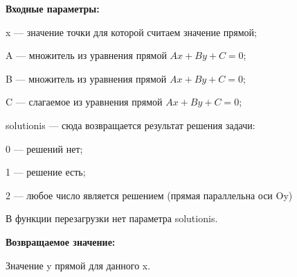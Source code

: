 \textbf{Входные параметры:}  
 
x --- значение точки для которой считаем значение прямой;
 
A --- множитель из уравнения прямой $Ax+By+C=0$;
 
B --- множитель из уравнения прямой $Ax+By+C=0$;
 
C --- слагаемое из уравнения прямой $Ax+By+C=0$;
 
solutionis --- сюда возвращается результат решения задачи:
 
 0 --- решений нет;
 
 1 --- решение есть;
 
 2 --- любое число является решением (прямая параллельна оси Oy)
 
 В функции перезагрузки нет параметра solutionis.

\textbf{Возвращаемое значение:}
 
Значение y прямой для данного x.